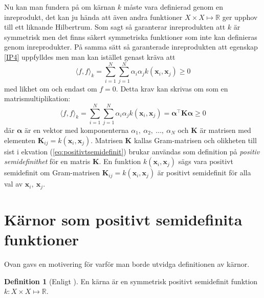 \documentclass[a4paper, 12pt]{report}
\theoremstyle{definition}
\newtheorem{defi}{Definition}[section]
\theoremstyle{remark}
\newcommand{\bfx}{\mathbf{x}}
\begin{document}
Nu kan man fundera på om kärnan $k$ måste vara definierad genom en inreprodukt, det kan ju hända att även andra funktioner $X \times X \longmapsto \mathbb{R}$ ger upphov till ett liknande Hilbertrum. Som sagt så garanterar inreprodukten att $k$ är symmetrisk men det finns säkert symmetriska funktioner som inte kan definieras genom inreprodukter. På samma sätt så garanterade inreprodukten att egenskap \ref{IP4} uppfylldes men man kan istället genast kräva att
\begin{equation*}
	\langle f, f \rangle_k = \sum_{i=1}^{N}\sum_{j=1}^{N}\alpha_i\alpha_jk\left(\bfx_i, \bfx_j\right) \geq 0
\end{equation*}
med likhet om och endast om $f=0$. Detta krav kan skrivas om som en matrismultiplikation:
\begin{equation}\label{eq:positivtsemidefinit}
\langle f, f \rangle_k = \sum_{i=1}^{N}\sum_{j=1}^{N}\alpha_i\alpha_jk\left(\bfx_i, \bfx_j\right) = \boldsymbol{\alpha}^\intercal \mathbf{K} \boldsymbol{\alpha}\geq 0
\end{equation}
där $\boldsymbol{\alpha}$ är en vektor med komponenterna $\alpha_1,~\alpha_2,~\dots,~\alpha_N$ och $\mathbf{K}$ är matrisen med elementen $\mathbf{K}_{ij}=k\left(\bfx_i, \bfx_j\right)$. Matrisen $\mathbf{K}$ kallas Gram-matrisen och olikheten till sist i ekvation (\ref{eq:positivtsemidefinit}) brukar användas som definition på \emph{positiv semidefinithet} för en matris $\mathbf{K}$. En funktion $k\left(\bfx_i, \bfx_j\right)$ sägs vara positivt semidefinit om Gram-matrisen $\mathbf{K}_{ij}=k\left(\bfx_i, \bfx_j\right)$ är positivt semidefinit för alla val av $\bfx_i,~\bfx_j$.
\section{Kärnor som positivt semidefinita funktioner}

Ovan gavs en motivering för varför man borde utvidga definitionen av kärnor.
\begin{defi}[Enligt \cite{LearningKernels}]
	En kärna är en symmetrisk positivt semidefinit funktion $k: X \times X \longmapsto \mathbb{R}$.
\end{defi}
\end{document}
